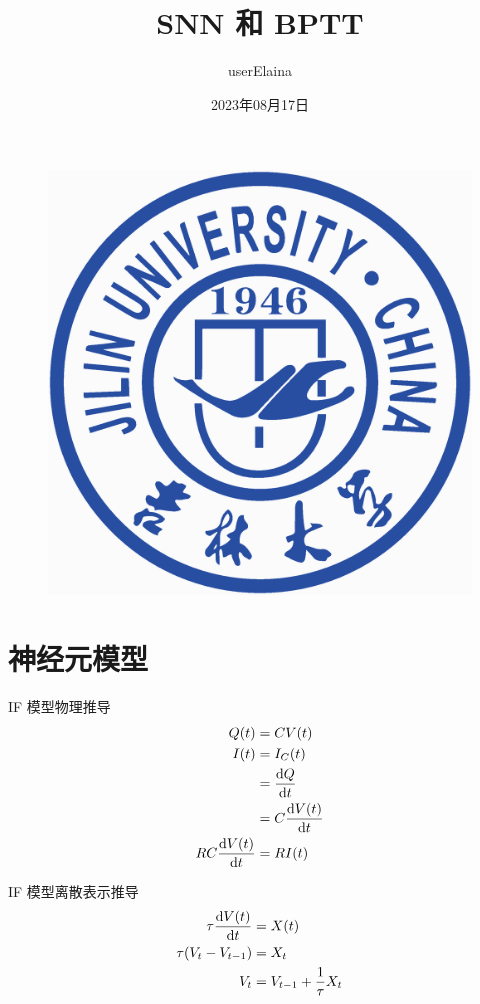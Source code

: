 \documentclass{beamer}
\author{userElaina}
\title{SNN 和 BPTT}
\subtitle{}
\institute{人工智能学院}
\date{2023年08月17日}
\begin{document}
\kaishu
\begin{frame}
    \titlepage
    \begin{figure}[htpb]
        \begin{center}
            \includegraphics[width=0.15\linewidth]{pic/Jilin_University_Logo.eps}
        \end{center}
    \end{figure}
\end{frame}

\begin{frame}
    \tableofcontents[sectionstyle=show,subsectionstyle=show/shaded/hide,subsubsectionstyle=show/shaded/hide]
\end{frame}


\section{神经元模型}

\begin{frame}{IF 模型物理推导}
    \begin{equation*}
        \begin{aligned}
            Q(t)
            &= CV(t) \\
            I(t)
            &= I_C(t) \\
            &= \frac{{\rm d}Q}{{\rm d}t} \\
            &= C\frac{{\rm d}V(t)}{{\rm d}t} \\
            RC\frac{{\rm d}V(t)}{{\rm d}t}
            &= RI(t)
        \end{aligned}
    \end{equation*}
\end{frame}

\begin{frame}{IF 模型离散表示推导}
    \begin{equation*}
        \begin{aligned}
            \tau\frac{{\rm d}V(t)}{{\rm d}t}
            &= X(t) \\
            \tau(V_t-V_{t-1})
            &= X_t \\
            V_t
            &= V_{t-1}+\frac{1}{\tau} X_t
        \end{aligned}
    \end{equation*}
\end{frame}
\end{document}

